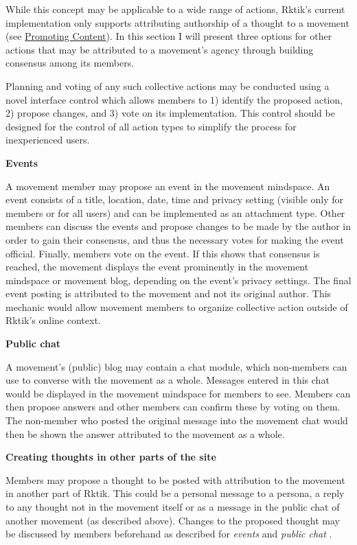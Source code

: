 While this concept may be applicable to a wide range of actions, Rktik's
current implementation only supports attributing authorship of a thought
to a movement (see \hyperref[promoting-content]{Promoting Content}). In
this section I will present three options for other actions that may be
attributed to a movement's agency through building consensus among its
members.

Planning and voting of any such collective actions may be conducted
using a novel interface control which allows members to 1) identify the
proposed action, 2) propose changes, and 3) vote on its implementation.
This control should be designed for the control of all action types to
simplify the process for inexperienced users.

\textbf{Events}

A movement member may propose an event in the movement mindspace. An
event consists of a title, location, date, time and privacy setting
(visible only for members or for all users) and can be implemented as an
attachment type. Other members can discuss the events and propose
changes to be made by the author in order to gain their consensus, and
thus the necessary votes for making the event official. Finally, members
vote on the event. If this shows that consensus is reached, the movement
displays the event prominently in the movement mindspace or movement
blog, depending on the event's privacy settings. The final event posting
is attributed to the movement and not its original author. This mechanic
would allow movement members to organize collective action outside of
Rktik's online context.

\textbf{Public chat}

A movement's (public) blog may contain a chat module, which non-members
can use to converse with the movement as a whole. Messages entered in
this chat would be displayed in the movement mindspace for members to
see. Members can then propose answers and other members can confirm
these by voting on them. The non-member who posted the original message
into the movement chat would then be shown the answer attributed to the
movement as a whole.

\textbf{Creating thoughts in other parts of the site}

Members may propose a thought to be posted with attribution to the
movement in another part of Rktik. This could be a personal message to a
persona, a reply to any thought not in the movement itself or as a
message in the public chat of another movement (as described above).
Changes to the proposed thought may be discussed by members beforehand
as described for \emph{events} and \emph{public chat} .

